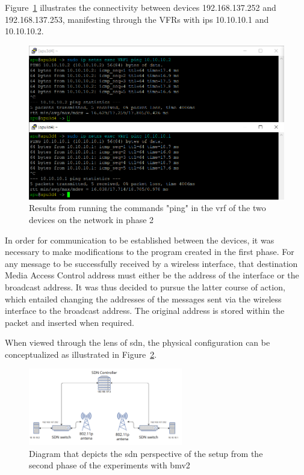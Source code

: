 Figure~\ref{fig:exp2_phase2_pings} illustrates the connectivity between devices 192.168.137.252 and 192.168.137.253, manifesting through the VFRs with \glspl{ip} 10.10.10.1 and 10.10.10.2.

\begin{figure}
	\centering
	\includegraphics[width=\textwidth]{Chapters/Figures/tests/bmv2_phase_2/pings.PNG}
	\caption{Results from running the commands "ping" in the \gls{vrf} of the two devices on the network in phase 2}
	\label{fig:exp2_phase2_pings}
\end{figure}

In order for communication to be established between the devices, it was necessary to make modifications to the program created in the first phase. For any message to be successfully received by a wireless interface, that destination Media Access Control address must either be the address of the interface or the broadcast address. It was thus decided to pursue the latter course of action, which entailed changing the addresses of the messages sent via the wireless interface to the broadcast address. The original address is stored within the packet and inserted when required.

When viewed through the lens of \gls{sdn}, the physical configuration can be conceptualized as illustrated in Figure~\ref{fig:exp2_phase2_sdn_diagram}.

\begin{figure}
	\centering
	\includegraphics[width=0.6\textwidth]{Chapters/Figures/tests/bmv2_phase_2/sdn_diagram.PNG}
	\caption{Diagram that depicts the \gls{sdn} perspective of the setup from the second phase of the experiments with \gls{bmv2}}
	\label{fig:exp2_phase2_sdn_diagram}
\end{figure}


